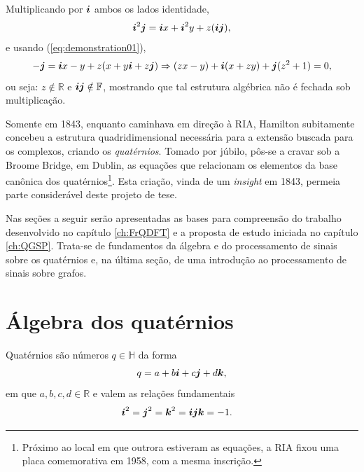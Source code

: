 Multiplicando por $\boldsymbol{i}$ ambos os lados identidade,
\begin{equation}
\boldsymbol{i}^2 \boldsymbol{j} = \boldsymbol{i} x + \boldsymbol{i}^2 y + z (\boldsymbol{i} \boldsymbol{j}),
\end{equation}
e usando (\ref{eq:demonstration01}),
\begin{equation}
- \boldsymbol{j} = \boldsymbol{i} x - y + z (x + y \boldsymbol{i} + z \boldsymbol{j})
\Rightarrow
(zx - y) + \boldsymbol{i} (x + zy) + \boldsymbol{j} (z^2 + 1) = 0,
\end{equation}
ou seja: $z \notin \mathbb{R}$ e $ \boldsymbol{i} \boldsymbol{j} \notin \mathbb{F} $, mostrando que tal estrutura alg\'ebrica n\~ao \'e fechada sob multiplica\c c\~ao.

Somente em 1843, enquanto caminhava em dire\c c\~ao \`a RIA, Hamilton subitamente concebeu a estrutura quadridimensional necess\'aria para a extens\~ao buscada para os complexos, criando os \emph{quat\'ernios}. Tomado por j\'ubilo, p\^os-se a cravar sob a Broome Bridge, em Dublin, as equa\c c\~oes que relacionam os elementos da base can\^onica dos quat\'ernios\footnote{Pr\'oximo ao local em que outrora estiveram as equa\c c\~oes, a RIA fixou uma placa comemorativa em 1958, com a mesma inscri\c c\~ao.}. Esta cria\c c\~ao, vinda de um \emph{insight} em 1843, permeia parte consider\'avel deste projeto de tese.


Nas se\c c\~oes a seguir ser\~ao apresentadas as bases para compreens\~ao do trabalho desenvolvido no cap\'itulo \ref{ch:FrQDFT} e a proposta de estudo iniciada no cap\'itulo \ref{ch:QGSP}. Trata-se de fundamentos da \'algebra e do processamento de sinais sobre os quat\'ernios e, na \'ultima se\c c\~ao, de uma introdu\c c\~ao ao processamento de sinais sobre grafos.


\section{\'Algebra dos quat\'ernios}

Quat\'ernios s\~ao n\'umeros $q \in \mathbb{H}$ da forma
\begin{equation}
q = a + b\boldsymbol{i} + c\boldsymbol{j} + d\boldsymbol{k},
\label{eq:q}
\end{equation}
em que $a, b, c, d \in \mathbb{R}$ e valem as rela\c c\~oes fundamentais
\begin{equation}
\label{eq:fund_rel}
\begin{aligned}
\boldsymbol{i} ^2 = \boldsymbol{j}^2 &=\boldsymbol{k}^2 = \boldsymbol{i} \boldsymbol{j} \boldsymbol{k} = -1.
\end{aligned}
\end{equation}

